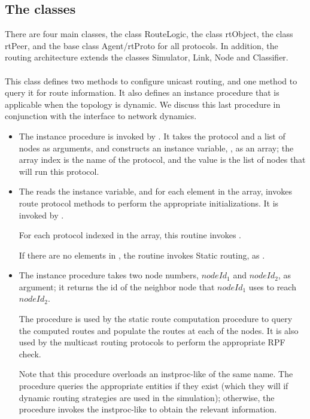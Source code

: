 \subsection{The classes}
There are four main classes,
the class RouteLogic, the class rtObject, the class rtPeer, and the
base class Agent/rtProto for all protocols.
In addition, the routing architecture extends 
the classes Simulator, Link, Node and Classifier.

\paragraph{\protect{}}
This class defines two methods to configure unicast routing,
and one method to query it for route information.
It also defines an instance procedure that is applicable when
the topology is dynamic.
We discuss this last procedure in conjunction
with the interface to network dynamics.
\begin{itemize}
\item The instance procedure
is invoked by .
It takes the protocol and a list of nodes as arguments,
and constructs an instance variable, , as an array;
the array index is the name of the protocol, and the value is the list
of nodes that will run this protocol.
\item The
reads the  instance variable, and 
for each element in the array, 
invokes route protocol methods to perform the appropriate initializations.
It is invoked by
.

For each protocol  indexed in the  array,
this routine invokes
.

If there are no elements in ,
the routine invokes Static routing, as
.

\item The instance procedure
takes two node numbers, $nodeId_1$ and $nodeId_2$, as argument;
it returns the id of the neighbor node that $nodeId_1$ uses to 
reach $nodeId_2$.

The procedure is used by the static route computation procedure to query
the computed routes and populate the routes at each of the nodes.
It is also used by the multicast routing protocols to perform the
appropriate RPF check.

Note that this procedure overloads an instproc-like of the same name.
The procedure queries the appropriate  entities
if they exist
(which they will if dynamic routing strategies are used in the simulation);
otherwise, the procedure invokes the instproc-like to obtain the relevant
information.
\end{itemize}

